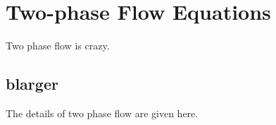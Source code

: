 \chapter{Two-phase Flow Equations}
\label{app:two_phase_flow}

Two phase flow is crazy.

\section{blarger}
\label{sect:blarger}
The details of two phase flow are given here.

